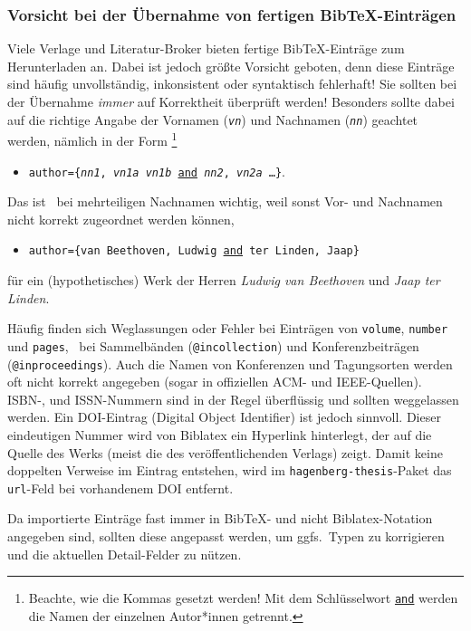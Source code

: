 \subsubsection{Vorsicht bei der Übernahme von fertigen BibTeX-Einträgen}

Viele Verlage und Literatur-Broker bieten fertige BibTeX-Einträge zum Herunterladen an. Dabei ist jedoch größte
Vorsicht geboten, denn diese Einträge sind häufig unvollständig, inkonsistent oder syntaktisch fehlerhaft! Sie
sollten bei der Übernahme \emph{immer} auf Korrektheit überprüft werden! Besonders sollte dabei auf die richtige
Angabe der Vornamen (\texttt{\textit{vn}}) und Nachnamen (\texttt{\textit{nn}}) geachtet werden, nämlich in der Form%
\footnote{Beachte, wie die Kommas gesetzt werden! Mit dem Schlüsselwort \underline{\texttt{and}} werden die Namen der
einzelnen Autor*innen getrennt.}
%
\begin{itemize}
\item[]
\texttt{author=\{\textit{nn1}, \textit{vn1a} \emph{vn1b} \underline{and} \textit{nn2}, \textit{vn2a} \ldots \}}.
\end{itemize}
%
Das ist \va\ bei mehrteiligen Nachnamen wichtig, weil sonst Vor- und Nachnamen nicht korrekt zugeordnet werden
können, \zB
%
\begin{itemize}
\item[]
\texttt{author=\{van Beethoven, Ludwig \underline{and} ter Linden, Jaap\}}
\end{itemize}
für ein (hypothetisches) Werk der Herren \emph{Ludwig van Beethoven} und \emph{Jaap ter Linden}.

Häufig finden sich Weglassungen oder Fehler bei Einträgen von \texttt{volume}, \texttt{number} und \texttt{pages},
\va\ bei Sammelbänden (\texttt{@incollection}) und Konferenzbeiträgen (\texttt{@inproceedings}). Auch die Namen von
Konferenzen und Tagungsorten werden oft nicht korrekt angegeben (sogar in offiziellen ACM- und IEEE-Quellen). ISBN-,
und ISSN-Nummern sind in der Regel überflüssig und sollten weggelassen werden. Ein DOI-Eintrag (Digital Object
Identifier) ist jedoch sinnvoll. Dieser eindeutigen Nummer wird von Biblatex ein Hyperlink hinterlegt, der auf die
Quelle des Werks (meist die des veröffentlichenden Verlags) zeigt. Damit keine doppelten Verweise im Eintrag
entstehen, wird im \texttt{hagenberg-thesis}-Paket das \texttt{url}-Feld bei vorhandenem DOI entfernt.

Da importierte Einträge fast immer in BibTeX- und nicht Biblatex-Notation angegeben sind, sollten diese angepasst
werden, um ggfs.\ Typen zu korrigieren und die aktuellen Detail-Felder zu nützen.



